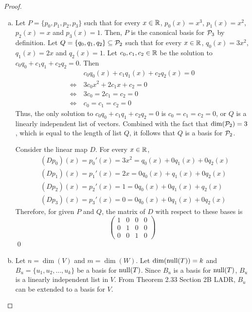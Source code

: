 \begin{proof}
    \renewcommand{\qedsymbol}{$\blacksquare$}
    \begin{enumerate}[(a)]
    \item
    Let $P=\{p_0,p_1,p_2,p_3\}$ such that for every $x\in\R$, $p_0(x)=x^3$, $p_1(x)=x^2$, $p_2(x)=x$ and $p_3(x)=1$.
    Then, $P$ is the canonical basis for $\P_3$ by definition.
    Let $Q=\{q_0,q_1,q_2\}\subseteq\P_2$ such that for every $x\in\R$, $q_0(x)=3x^2$, $q_1(x)=2x$ and $q_2(x)=1$.
    Let $c_0,c_1,c_2\in\R$ be the solution to $c_0q_0+c_1q_1+c_2q_2=0$.
    Then 
    \[
        \begin{aligned}
            &c_0q_0(x)+c_1q_1(x)+c_2q_2(x)=0\\
            \Leftrightarrow\
            &3c_0x^2+2c_1x+c_2=0\\
            \Leftrightarrow\
            &3c_0=2c_1=c_2=0\\
            \Leftrightarrow\
            &c_0=c_1=c_2=0
        \end{aligned}
    \]
    Thus, the only solution to $c_0q_0+c_1q_1+c_2q_2=0$ is $c_0=c_1=c_2=0$, or $Q$ is a linearly independent list of vectors.
    Combined with the fact that $\dim(\P_2)=3$, which is equal to the length of list $Q$, it follows that $Q$ is a basis for $\P_2$.

    Consider the linear map $D$. For every $x\in\R$, 
    \[
        \begin{aligned}
            &(Dp_0)(x)=p_0'(x)=3x^2=q_0(x)+0q_1(x)+0q_2(x)\\
            &(Dp_1)(x)=p_1'(x)=2x=0q_0(x)+q_1(x)+0q_2(x)\\
            &(Dp_2)(x)=p_2'(x)=1=0q_0(x)+0q_1(x)+q_2(x)\\
            &(Dp_3)(x)=p_3'(x)=0=0q_0(x)+0q_1(x)+0q_2(x)
        \end{aligned}
    \]
    Therefore, for given $P$ and $Q$, the matrix of $D$ with respect to these bases is 
    \[
        \begin{pmatrix}
            1 & 0 & 0 & 0\\
            0 & 1 & 0 & 0\\
            0 & 0 & 1 & 0
        \end{pmatrix}    
    \]\qed
    \item Let $n=\dim(V)$ and $m=\dim(W)$.
    Let $\dim(\nullla(T))=k$ and $B_u=\{u_1,u_2,...,u_k\}$ be a basis for $\nullla(T)$.
    Since $B_u$ is a basis for $\nullla(T)$, $B_u$ is a linearly independent list in $V$.
    From Theorem 2.33 Section 2B LADR, $B_u$ can be extended to a basis for $V$.


\end{enumerate}
\end{proof}
